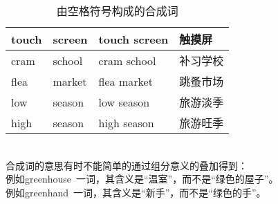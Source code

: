 \documentclass[UTF8]{ctexart}
\begin{document}
    \begin{table}[h!]
        \begin{center}
            \ttfamily
            \begin{tabular}{p{60pt}|p{60pt}|p{80pt}|p{60pt}}
                \hline
                touch&screen&touch screen&触摸屏\\ \hline
                cram&school&cram school&补习学校\\ \hline
                flea&market&flea market&跳蚤市场\\ \hline
                low&season&low season&旅游淡季\\ \hline
                high&season&high season&旅游旺季\\ \hline
            \end{tabular}
            \rmfamily
            \caption{由空格符号构成的合成词}
        \end{center}
    \end{table}\\
    合成词的意思有时不能简单的通过组分意义的叠加得到：\\[3mm]
    例如{\ttfamily greenhouse~}一词，其含义是“温室”，而不是“绿色的屋子”。\\[3mm]
    例如{\ttfamily greenhand\hphantom{s}~}一词，其含义是“新手”，而不是“绿色的手”。\\[3mm]

\newpage
\end{document}
